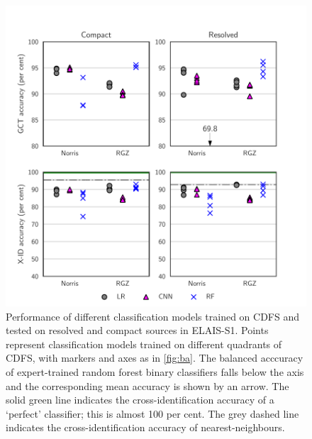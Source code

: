 \documentclass[fleqn,usenatbib,usedcolumn]{mnras}
\begin{document}
  \begin{figure}
  \centering
  \includegraphics[width=\columnwidth]{images/elais-grid-new.pdf}
  \caption{Performance of different classification models trained on CDFS and tested on
  resolved and compact sources in ELAIS-S1. Points represent classification models
  trained on different quadrants of CDFS, with markers and axes as in
  \autoref{fig:ba}. The balanced acccuracy of expert-trained random forest
  binary classifiers falls below the axis and the corresponding mean accuracy is
  shown by an arrow. The solid green line indicates the cross-identification
  accuracy of a `perfect' classifier; this is almost 100 per cent. The grey
  dashed line indicates the cross-identification accuracy of
  nearest-neighbours.
    \label{fig:elais-ba}}
  \end{figure}
\end{document}
